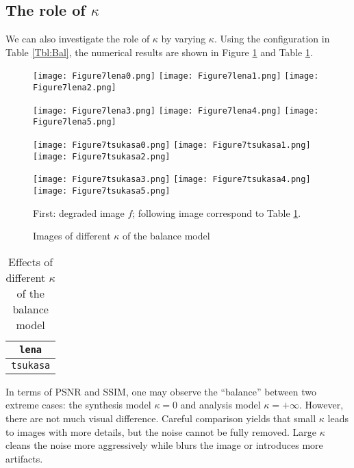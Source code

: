 \documentclass[english, nochinese]{pnote}
\begin{document}
\subsection{The role of $\kappa$}

We can also investigate the role of $\kappa$ by varying $\kappa$. Using the configuration in Table \ref{Tbl:Bal}, the numerical results are shown in Figure \ref{Fig:BalKap} and Table \ref{Tbl:BalKap}.

\begin{figure}[htbp]
{
\centering

\texttt{[image: Figure7lena0.png]}
\texttt{[image: Figure7lena1.png]}
\texttt{[image: Figure7lena2.png]}

\texttt{[image: Figure7lena3.png]}
\texttt{[image: Figure7lena4.png]}
\texttt{[image: Figure7lena5.png]}

\texttt{[image: Figure7tsukasa0.png]}
\texttt{[image: Figure7tsukasa1.png]}
\texttt{[image: Figure7tsukasa2.png]}

\texttt{[image: Figure7tsukasa3.png]}
\texttt{[image: Figure7tsukasa4.png]}
\texttt{[image: Figure7tsukasa5.png]}

\caption{Images of different $\kappa$ of the balance model}
\label{Fig:BalKap}
}
{
\footnotesize First: degraded image $f$; following image correspond to Table \ref{Tbl:BalKap}.
}
\end{figure}

\begin{table}[htbp]
\centering
\begin{tabular}{|c|c|c|c|c|c|c|}
\hline
\multicolumn{7}{|c|}{\texttt{lena}} \\
\hline

\multicolumn{7}{|c|}{\texttt{tsukasa}} \\
\hline

\end{tabular}
\caption{Effects of different $\kappa$ of the balance model}
\label{Tbl:BalKap}
\end{table}

In terms of PSNR and SSIM, one may observe the ``balance'' between two extreme cases: the synthesis model $ \kappa = 0 $ and analysis model $ \kappa = +\infty $. However, there are not much visual difference. Careful comparison yields that small $\kappa$ leads to images with more details, but the noise cannot be fully removed. Large $\kappa$ cleans the noise more aggressively while blurs the image or introduces more artifacts.
\end{document}
